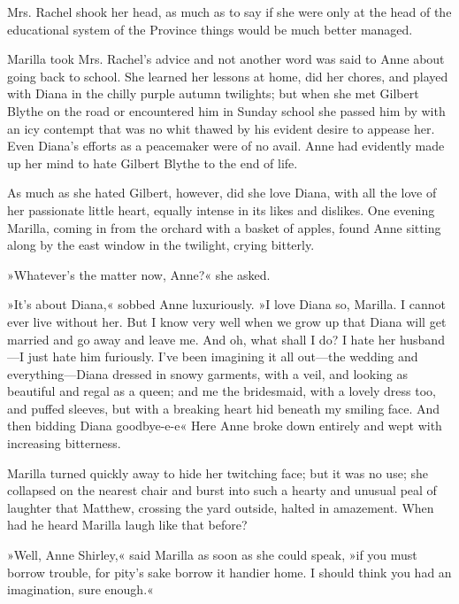 Mrs. Rachel shook her head, as much as to say if she were only at the head of the educational system of the Province things would be much better managed.

Marilla took Mrs. Rachel’s advice and not another word was said to Anne about going back to school. She learned her lessons at home, did her chores, and played with Diana in the chilly purple autumn twilights; but when she met Gilbert Blythe on the road or encountered him in Sunday school she passed him by with an icy contempt that was no whit thawed by his evident desire to appease her. Even Diana’s efforts as a peacemaker were of no avail. Anne had evidently made up her mind to hate Gilbert Blythe to the end of life.

As much as she hated Gilbert, however, did she love Diana, with all the love of her passionate little heart, equally intense in its likes and dislikes. One evening Marilla, coming in from the orchard with a basket of apples, found Anne sitting along by the east window in the twilight, crying bitterly.

»Whatever’s the matter now, Anne?« she asked.

»It’s about Diana,« sobbed Anne luxuriously. »I love Diana so, Marilla. I cannot ever live without her. But I know very well when we grow up that Diana will get married and go away and leave me. And oh, what shall I do? I hate her husband—I just hate him furiously. I’ve been imagining it all out—the wedding and everything—Diana dressed in snowy garments, with a veil, and looking as beautiful and regal as a queen; and me the bridesmaid, with a lovely dress too, and puffed sleeves, but with a breaking heart hid beneath my smiling face. And then bidding Diana goodbye-e-e\longdash« Here Anne broke down entirely and wept with increasing bitterness.

Marilla turned quickly away to hide her twitching face; but it was no use; she collapsed on the nearest chair and burst into such a hearty and unusual peal of laughter that Matthew, crossing the yard outside, halted in amazement. When had he heard Marilla laugh like that before?

»Well, Anne Shirley,« said Marilla as soon as she could speak, »if you must borrow trouble, for pity’s sake borrow it handier home. I should think you had an imagination, sure enough.«